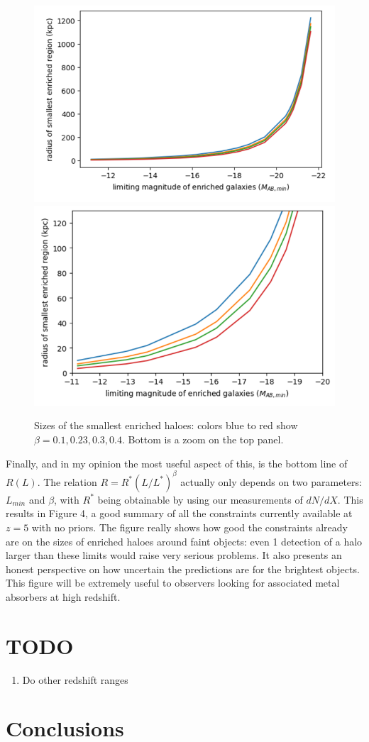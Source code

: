 \documentclass[useAMS,usenatbib]{mn2e}
\begin{document}
\begin{figure}
\includegraphics[width=\columnwidth]{plots/smallest1.png}
\includegraphics[width=\columnwidth]{plots/smallest2.png}
\caption{Sizes of the smallest enriched haloes: colors blue to red show $\beta=0.1, 0.23, 0.3, 0.4$. Bottom is a zoom on the top panel.}
\end{figure}


Finally, and in my opinion the most useful aspect of this, is the bottom line of $R(L)$. The relation $R=R^* (L/L^*)^\beta$ actually only depends on two parameters: $L_{min}$ and $\beta$, with $R^*$ being obtainable by using our measurements of $dN/dX$. This results in Figure 4, a good summary of all the constraints currently available at $z=5$ with no priors. The figure really shows how good the constraints already are on the sizes of enriched haloes around faint objects: even 1 detection of a halo larger than these limits would raise very serious problems. It also presents an honest perspective on how uncertain the predictions are for the brightest objects. This figure will be extremely useful to observers looking for associated metal absorbers at high redshift.



\section{TODO}
\begin{enumerate}
\item Do other redshift ranges
\end{enumerate}

\section{Conclusions}

 
\end{document}
